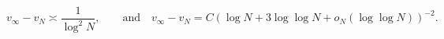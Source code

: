 \begin{equation*}
    v_\infty - v_N
    \asymp
    \frac{1}{\log^2 N},
    \qquad
    \text{and}\quad
    v_\infty - v_N
    =
    C{\left(\log N+3\log\log N+o_N(\log\log N)\right)^{-2}}.
\end{equation*}
